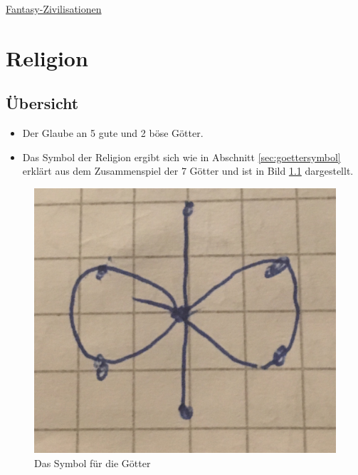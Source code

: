 \href{http://www.weltenbau-wissen.de/2016/02/5-rezepte-fantasy-kulturen-zivilisationen/}{Fantasy-Zivilisationen}

\chapter{Religion}
\section{Übersicht}
\begin{itemize}
	\item Der Glaube an 5 gute und 2 böse Götter.
	\item Das Symbol der Religion ergibt sich wie in Abschnitt \ref{sec:goettersymbol} erklärt aus dem Zusammenspiel der 7 Götter und ist in Bild \ref{fig:goettersymbol} dargestellt.
\end{itemize}

\begin{figure}
	\centering
	\includegraphics[width=0.3\textheight]{Abbildungen/Gesellschaft/Goettersymbol}
	\caption[Göttersymbol]{Das Symbol für die Götter}
	\label{fig:goettersymbol}
\end{figure}

